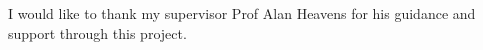 I would like to thank my supervisor Prof Alan Heavens for his guidance and support through this project. 